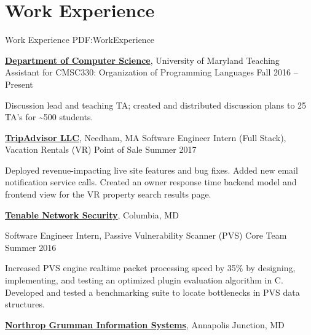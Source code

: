 
\section
{Work Experience}
{Work Experience}
{PDF:WorkExperience}

\href{https://cs.umd.edu/}
{\textbf{Department of Computer Science}},
University of Maryland
\hfill
\GapNoBreak
\hspace{1em} Teaching Assistant for CMSC330: Organization of Programming Languages
\hfill
Fall 2016 -- 
Present
\begin{detail}
\SubBulletItem
Discussion lead and teaching TA; created and distributed discussion plans to 25 TA's for \textasciitilde500 students.
\end{detail}
\GapNoBreak
\href{https://www.tripadvisor.com/}
{\textbf{TripAdvisor LLC}},
Needham, MA
\GapNoBreak
\hspace{1em} Software Engineer Intern (Full Stack), Vacation Rentals (VR) Point of Sale
\hfill
Summer 2017
\begin{detail}
\SubBulletItem
Deployed revenue-impacting live site features and bug fixes. Added new email notification service calls.
\SubBulletItem  Created an owner response time backend model and frontend view for the VR property search results page.
\end{detail}

\GapNoBreak
\href{https://www.tenable.com/}
{\textbf{Tenable Network Security}},
Columbia, MD

\GapNoBreak
\hspace{1em} Software Engineer Intern, Passive Vulnerability Scanner (PVS) Core Team
\hfill
Summer 2016
\begin{detail}
\SubBulletItem
Increased PVS engine realtime packet processing speed by 35\% by designing, implementing, and testing an optimized plugin evaluation algorithm in C.
\SubBulletItem
Developed and tested a benchmarking suite to locate bottlenecks in PVS data structures.
\end{detail}

\Gap
\href{https://www.ngc.com/}
{\textbf{Northrop Grumman Information Systems}},
Annapolis Junction, MD

